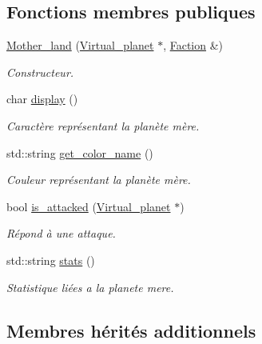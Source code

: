 \subsection*{Fonctions membres publiques}
\begin{DoxyCompactItemize}
\item 
\hyperlink{classMother__land_a8fd578b591a99a926bebd55959492997}{Mother\-\_\-land} (\hyperlink{classVirtual__planet}{Virtual\-\_\-planet} $\ast$, \hyperlink{classFaction}{Faction} \&)
\begin{DoxyCompactList}\small\item\em Constructeur. \end{DoxyCompactList}\item 
\hypertarget{classMother__land_ae50ab9634b50efcb8a9f0fe275342923}{char \hyperlink{classMother__land_ae50ab9634b50efcb8a9f0fe275342923}{display} ()}\label{classMother__land_ae50ab9634b50efcb8a9f0fe275342923}

\begin{DoxyCompactList}\small\item\em Caractère représentant la planète mère. \end{DoxyCompactList}\item 
\hypertarget{classMother__land_a2a862d8ca3bf717ef885edc50ea92a8d}{std\-::string \hyperlink{classMother__land_a2a862d8ca3bf717ef885edc50ea92a8d}{get\-\_\-color\-\_\-name} ()}\label{classMother__land_a2a862d8ca3bf717ef885edc50ea92a8d}

\begin{DoxyCompactList}\small\item\em Couleur représentant la planète mère. \end{DoxyCompactList}\item 
bool \hyperlink{classMother__land_a295325cdedbfcfb17c200a4a7438761c}{is\-\_\-attacked} (\hyperlink{classVirtual__planet}{Virtual\-\_\-planet} $\ast$)
\begin{DoxyCompactList}\small\item\em Répond à une attaque. \end{DoxyCompactList}\item 
std\-::string \hyperlink{classMother__land_af32a59d0595e545809f3cb00f50cacaf}{stats} ()
\begin{DoxyCompactList}\small\item\em Statistique liées a la planete mere. \end{DoxyCompactList}\end{DoxyCompactItemize}
\subsection*{Membres hérités additionnels}


